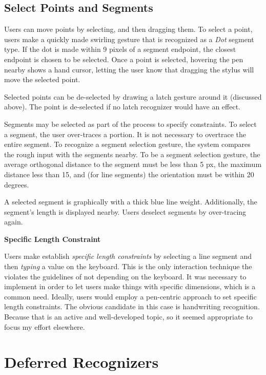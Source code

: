 

\subsection{Select Points and Segments}

Users can move points by selecting, and then dragging them. To select
a point, users make a quickly made swirling gesture that is recognized
as a \textit{Dot} segment type. If the dot is made within 9 pixels of
a segment endpoint, the closest endpoint is chosen to be
selected. Once a point is selected, hovering the pen nearby shows a
hand cursor, letting the user know that dragging the stylus will move
the selected point.

Selected points can be de-selected by drawing a latch gesture around it
(discussed above). The point is de-selected if no latch recognizer
would have an effect.

Segments may be selected as part of the process to specify  constraints. To select a segment, the user over-traces a
portion. It is not necessary to overtrace the entire segment. To
recognize a segment selection gesture, the system compares the rough
input with the segments nearby. To be a segment selection gesture, the
average orthogonal distance to the segment must be less than 5 px, the
maximum distance less than 15, and (for line segments) the orientation
must be within 20 degrees.

A selected segment is graphically with a thick blue line
weight. Additionally, the segment's length is displayed nearby. Users
deselect segments by over-tracing again.

\vspace{16pt}
\textbf{Specific Length Constraint}

Users make establish \textit{specific length constraints} by selecting
a line segment and then \textit{typing} a value on the keyboard. This
is the only interaction technique the violates the guidelines of not
depending on the keyboard. It was necessary to implement in order to
let users make things with specific dimensions, which is a common
need. Ideally, users would employ a pen-centric approach to set
specific length constraints. The obvious candidate in this case is
handwriting recognition. Because that is an active and well-developed
topic, so it seemed appropriate to focus my effort elsewhere.

\section{Deferred Recognizers}

